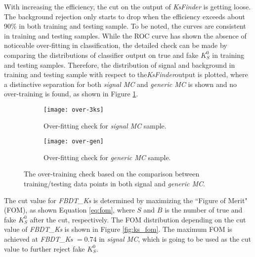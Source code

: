 With increasing the efficiency, the cut on the output of \textit{KsFinder} is getting loose. The background rejection only starts to drop when the efficiency exceeds about 90\% in both training and testing sample. To be noted, the curves are consistent in training and testing samples. 
While the ROC curve has shown the absence of noticeable over-fitting in classification, the detailed check can be made by comparing the distributions of classifier output on true and fake $K_S^0$ in training and testing samples. Therefore, the distribution of signal and background in training and testing sample with respect to the\textit{KsFinder}output is plotted, where a distinctive separation for both \textit{signal MC} and \textit{generic MC} is shown and no over-training is found, as shown in Figure \ref{fig:ks_overtraining}.
\begin{figure}[htpb]
	\begin{subfigure}{1\linewidth}
		\centering
		\texttt{[image: over-3ks]}
		\caption{Over-fitting check for \textit{signal MC} sample.}
	\end{subfigure}
  	\vspace{0.3cm}

	\begin{subfigure}{1\linewidth}
		\centering
		\texttt{[image: over-gen]}
		\caption{Over-fitting check for \textit{generic MC} sample.}
	\end{subfigure}
\caption{The over-training check based on the comparison between training/testing data points in both signal and \textit{generic MC}.}
\label{fig:ks_overtraining}
	\vspace{0.3cm}
	
\end{figure}

The cut value for \textit{FBDT\_Ks} is determined by maximizing the ``Figure of Merit" (FOM), as shown Equation \ref{eq:fom}, where $S$ and $B$ is the number of true and fake $K_S^0$ after the cut, respectively. The FOM distribution depending on the cut value of \textit{FBDT\_Ks} is shown in Figure \ref{fig:ks_fom}. The maximum FOM is achieved at \textit{FBDT\_Ks} $= 0.74$ in \textit{signal MC}, which is going to be used as the cut value to further reject fake $K_S^0$.

